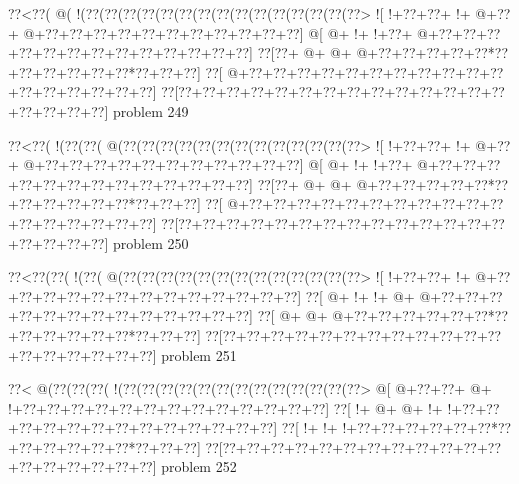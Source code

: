 \vbox{\vbox{\goo
\0??<\0??(\- @(\- !(\0??(\0??(\0??(\0??(\0??(\0??(\0??(\0??(\0??(\0??(\0??(\0??(\0??(\0??(\0??>
\- ![\- !+\0??+\0??+\- !+\- @+\0??+\- @+\0??+\0??+\0??+\0??+\0??+\0??+\0??+\0??+\0??+\0??+\0??]
\- @[\- @+\- !+\- !+\0??+\- @+\0??+\0??+\0??+\0??+\0??+\0??+\0??+\0??+\0??+\0??+\0??+\0??+\0??]
\0??[\0??+\- @+\- @+\- @+\0??+\0??+\0??+\0??+\0??*\0??+\0??+\0??+\0??+\0??+\0??*\0??+\0??+\0??]
\0??[\- @+\0??+\0??+\0??+\0??+\0??+\0??+\0??+\0??+\0??+\0??+\0??+\0??+\0??+\0??+\0??+\0??+\0??]
\0??[\0??+\0??+\0??+\0??+\0??+\0??+\0??+\0??+\0??+\0??+\0??+\0??+\0??+\0??+\0??+\0??+\0??+\0??]
}
\hfil problem 249\hfil\break
}



\vbox{\vbox{\goo
\0??<\0??(\- !(\0??(\0??(\- @(\0??(\0??(\0??(\0??(\0??(\0??(\0??(\0??(\0??(\0??(\0??(\0??(\0??>
\- ![\- !+\0??+\0??+\- !+\- @+\0??+\- @+\0??+\0??+\0??+\0??+\0??+\0??+\0??+\0??+\0??+\0??+\0??]
\- @[\- @+\- !+\- !+\0??+\- @+\0??+\0??+\0??+\0??+\0??+\0??+\0??+\0??+\0??+\0??+\0??+\0??+\0??]
\0??[\0??+\- @+\- @+\- @+\0??+\0??+\0??+\0??+\0??*\0??+\0??+\0??+\0??+\0??+\0??*\0??+\0??+\0??]
\0??[\- @+\0??+\0??+\0??+\0??+\0??+\0??+\0??+\0??+\0??+\0??+\0??+\0??+\0??+\0??+\0??+\0??+\0??]
\0??[\0??+\0??+\0??+\0??+\0??+\0??+\0??+\0??+\0??+\0??+\0??+\0??+\0??+\0??+\0??+\0??+\0??+\0??]
}
\hfil problem 250\hfil\break
}



\vbox{\vbox{\goo
\0??<\0??(\0??(\- !(\0??(\- @(\0??(\0??(\0??(\0??(\0??(\0??(\0??(\0??(\0??(\0??(\0??(\0??(\0??>
\- ![\- !+\0??+\0??+\- !+\- @+\0??+\0??+\0??+\0??+\0??+\0??+\0??+\0??+\0??+\0??+\0??+\0??+\0??]
\0??[\- @+\- !+\- !+\- @+\- @+\0??+\0??+\0??+\0??+\0??+\0??+\0??+\0??+\0??+\0??+\0??+\0??+\0??]
\0??[\- @+\- @+\- @+\0??+\0??+\0??+\0??+\0??+\0??*\0??+\0??+\0??+\0??+\0??+\0??*\0??+\0??+\0??]
\0??[\0??+\0??+\0??+\0??+\0??+\0??+\0??+\0??+\0??+\0??+\0??+\0??+\0??+\0??+\0??+\0??+\0??+\0??]
}
\hfil problem 251\hfil\break
}



\vbox{\vbox{\goo
\0??<\- @(\0??(\0??(\0??(\- !(\0??(\0??(\0??(\0??(\0??(\0??(\0??(\0??(\0??(\0??(\0??(\0??(\0??>
\- @[\- @+\0??+\0??+\- @+\- !+\0??+\0??+\0??+\0??+\0??+\0??+\0??+\0??+\0??+\0??+\0??+\0??+\0??]
\0??[\- !+\- @+\- @+\- !+\- !+\0??+\0??+\0??+\0??+\0??+\0??+\0??+\0??+\0??+\0??+\0??+\0??+\0??]
\0??[\- !+\- !+\- !+\0??+\0??+\0??+\0??+\0??+\0??*\0??+\0??+\0??+\0??+\0??+\0??*\0??+\0??+\0??]
\0??[\0??+\0??+\0??+\0??+\0??+\0??+\0??+\0??+\0??+\0??+\0??+\0??+\0??+\0??+\0??+\0??+\0??+\0??]
}
\hfil problem 252\hfil\break
}



